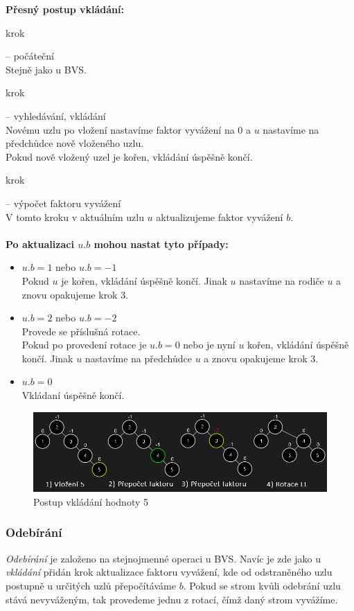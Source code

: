 \documentclass[
  biblatex=false,
  font=serif,
  glossaries=false,
  tables=false,
  theorems=false,
  index
]{kidiplom}
\begin{document}
\newpage
\noindent \textbf{Přesný postup vkládání:}
\begin{enumerate} {\bfseries
\item  krok} -- počáteční \\
Stejně jako u BVS.
{\bfseries\item  krok} -- vyhledávání, vkládání \\
Novému uzlu po vložení nastavíme faktor vyvážení na 0 a $u$ nastavíme na předchůdce nově vloženého uzlu.\\
Pokud nově vložený uzel je kořen, vkládání úspěšně končí.
{\bfseries\item  krok} -- výpočet faktoru vyvážení \\
V tomto kroku v aktuálním uzlu $u$ aktualizujeme faktor vyvážení $b$.\\\\
\textbf{Po aktualizaci $u.b$ mohou nastat tyto případy:}
\begin{itemize}
\item $u.b = 1$ nebo $u.b = -1$\\
Pokud $u$ je kořen, vkládání úspěšně končí. Jinak $u$ nastavíme na rodiče $u$ a znovu opakujeme krok 3.
\item $u.b = 2$ nebo $u.b = -2$\\
Provede se příslušná rotace.\\
Pokud po provedení rotace je $u.b = 0$ nebo je nyní $u$ kořen, vkládání úspěšně končí. Jinak $u$ nastavíme na předchůdce $u$ a znovu opakujeme krok 3.
\item $u.b = 0$\\
Vkládaní úspěšně končí.
\end{itemize}
\end{enumerate}

\begin{figure}[h!]
\centering
	\includegraphics[scale=0.55]{obrazky/15AVLVlozeni.png}
	\caption{Postup vkládání hodnoty 5}
\end{figure}

\subsubsection{Odebírání}
\indent\indent \textit{Odebírání} je založeno na stejnojmenné operaci u BVS. Navíc je zde jako u \textit{vkládání} přidán krok aktualizace faktoru vyvážení, kde od odstraněného uzlu postupně u určitých uzlů přepočítáváme $b$. Pokud se strom kvůli odebrání uzlu stává nevyváženým, tak provedeme jednu z rotací, čímž daný strom vyvážíme. 
\end{document}
